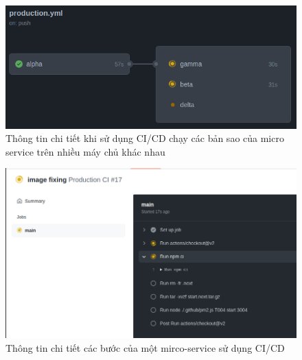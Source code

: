 \clearpage
\begin{figure}[h!]
	\begin{center}	
		\includegraphics[width=\textwidth]{./results/jobs}
		\caption{Thông tin chi tiết khi sử dụng CI/CD chạy các bản sao của micro service trên nhiều máy chủ khác nhau}
	\end{center}
\end{figure}


\begin{figure}[h!]
	\begin{center}	
		\includegraphics[width=\textwidth]{./results/production}
		\caption{Thông tin chi tiết các bước của một mirco-service sử dụng CI/CD}
	\end{center}
\end{figure}


